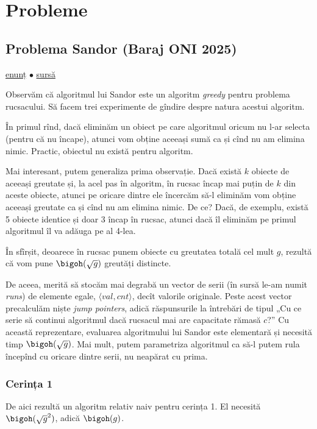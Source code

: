\section{Probleme}

\subsection{Problema Sandor (Baraj ONI 2025)}
\label{problem:sandor}

\href{https://kilonova.ro/problems/3731}{enunț}
$\bullet$
\hyperref[code:sandor]{sursă}

Observăm că algoritmul lui Sandor este un algoritm \textit{greedy} pentru problema rucsacului. Să facem trei experimente de gîndire despre natura acestui algoritm.

În primul rînd, dacă eliminăm un obiect pe care algoritmul oricum nu l-ar selecta (pentru că nu încape), atunci vom obține aceeași sumă ca și cînd nu am elimina nimic. Practic, obiectul nu există pentru algoritm.

Mai interesant, putem generaliza prima observație. Dacă există $k$ obiecte de aceeași greutate și, la acel pas în algoritm, în rucsac încap mai puțin de $k$ din aceste obiecte, atunci pe oricare dintre ele încercăm să-l eliminăm vom obține aceeași greutate ca și cînd nu am elimina nimic. De ce? Dacă, de exemplu, există 5 obiecte identice și doar 3 încap în rucsac, atunci dacă îl eliminăm pe primul algoritmul îl va adăuga pe al 4-lea.

În sfîrșit, deoarece în rucsac punem obiecte cu greutatea totală cel mult $g$, rezultă că vom pune $\bigoh(\sqrt{g})$ greutăți distincte.

De aceea, merită să stocăm mai degrabă un vector de serii (în sursă le-am numit \textit{runs}) de elemente egale, $\langle val, cnt \rangle$, decît valorile originale. Peste acest vector precalculăm niște \textit{jump pointers}, adică răspunsurile la întrebări de tipul „Cu ce serie să continui algoritmul dacă rucsacul mai are capacitate rămasă $c$?” Cu această reprezentare, evaluarea algoritmului lui Sandor este elementară și necesită timp $\bigoh(\sqrt{g})$. Mai mult, putem parametriza algoritmul ca să-l putem rula începînd cu oricare dintre serii, nu neapărat cu prima.

\subsubsection*{Cerința 1}

De aici rezultă un algoritm relativ naiv pentru cerința 1. El necesită $\bigoh(\sqrt{g}^2)$, adică $\bigoh(g)$.

